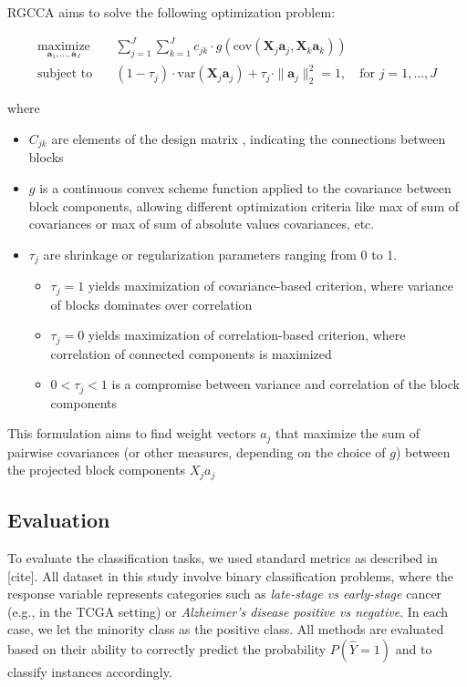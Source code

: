 \documentclass[
]{article}
\providecommand{\tightlist}{%
  \setlength{\itemsep}{0pt}\setlength{\parskip}{0pt}}
\begin{document}
RGCCA aims to solve the following optimization problem:

\[
\begin{aligned}
\underset{\mathbf{a}_1, \ldots, \mathbf{a}_J}{\text{maximize}} & \quad \sum_{j=1}^{J} \sum_{k=1}^{J} c_{jk} \cdot g\left( \text{cov}(\mathbf{X}_j \mathbf{a}_j, \mathbf{X}_k \mathbf{a}_k) \right) \\
\text{subject to} & \quad (1 - \tau_j) \cdot \text{var}(\mathbf{X}_j \mathbf{a}_j) + \tau_j \cdot \|\mathbf{a}_j\|_2^2 = 1, \quad \text{for } j = 1, \ldots, J
\end{aligned}
\]

where

\begin{itemize}
\tightlist
\item
  \(C_{jk}\) are elements of the design matrix , indicating the connections between blocks
\item
  \(g\) is a continuous convex scheme function applied to the covariance between block components, allowing different optimization criteria like max of sum of covariances or max of sum of absolute values covariances, etc.
\item
  \(\tau_j\) are shrinkage or regularization parameters ranging from 0 to 1.

  \begin{itemize}
  \tightlist
  \item
    \(\tau_j = 1\) yields maximization of covariance-based criterion, where variance of blocks dominates over correlation
  \item
    \(\tau_j = 0\) yields maximization of correlation-based criterion, where correlation of connected components is maximized
  \item
    \(0 < \tau_j < 1\) is a compromise between variance and correlation of the block components
  \end{itemize}
\end{itemize}

This formulation aims to find weight vectors \(a_j\) that maximize the sum of pairwise covariances (or other measures, depending on the choice of \(g\)) between the projected block components \(X_ja_j\)

\hypertarget{evaluation}{%
\subsection{Evaluation}\label{evaluation}}

To evaluate the classification tasks, we used standard metrics as described in {[}cite{]}. All dataset in this study involve binary classification problems, where the response variable represents categories such as \emph{late-stage vs early-stage} cancer (e.g., in the TCGA setting) or \emph{Alzheimer's disease positive vs negative}. In each case, we let the minority class as the positive class. All methods are evaluated based on their ability to correctly predict the probability \(P(\hat{Y} = 1)\) and to classify instances accordingly.
\end{document}
